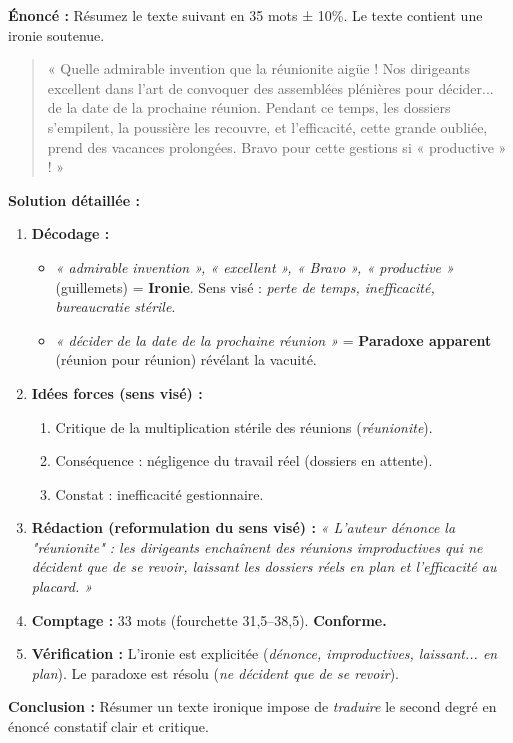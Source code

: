 \documentclass[11pt]{article}
\begin{document}
\begin{exoresolu}
\textbf{Énoncé :} Résumez le texte suivant en 35 mots ± 10\%. Le texte contient une ironie soutenue.
\begin{quote}
« Quelle admirable invention que la réunionite aigüe ! Nos dirigeants excellent dans l'art de convoquer des assemblées plénières pour décider... de la date de la prochaine réunion. Pendant ce temps, les dossiers s'empilent, la poussière les recouvre, et l'efficacité, cette grande oubliée, prend des vacances prolongées. Bravo pour cette gestions si « productive » ! »
\end{quote}
\tcblower
\textbf{Solution détaillée :}
\begin{enumerate}
    \item \textbf{Décodage :}
    \begin{itemize}
        \item \emph{« admirable invention », « excellent », « Bravo », « productive »} (guillemets) = \textbf{Ironie}. Sens visé : \emph{perte de temps, inefficacité, bureaucratie stérile}.
        \item \emph{« décider de la date de la prochaine réunion »} = \textbf{Paradoxe apparent} (réunion pour réunion) révélant la vacuité.
    \end{itemize}
    \item \textbf{Idées forces (sens visé) :}
    \begin{enumerate}
        \item Critique de la multiplication stérile des réunions (\emph{réunionite}).
        \item Conséquence : négligence du travail réel (dossiers en attente).
        \item Constat : inefficacité gestionnaire.
    \end{enumerate}
    \item \textbf{Rédaction (reformulation du sens visé) :}
    \emph{« L'auteur dénonce la "réunionite" : les dirigeants enchaînent des réunions improductives qui ne décident que de se revoir, laissant les dossiers réels en plan et l'efficacité au placard. »}
    \item \textbf{Comptage :} 33 mots (fourchette 31,5--38,5). \textbf{Conforme.}
    \item \textbf{Vérification :} L'ironie est explicitée (\emph{dénonce, improductives, laissant... en plan}). Le paradoxe est résolu (\emph{ne décident que de se revoir}).
\end{enumerate}
\textbf{Conclusion :} Résumer un texte ironique impose de \emph{traduire} le second degré en énoncé constatif clair et critique.
\end{exoresolu}
\end{document}
